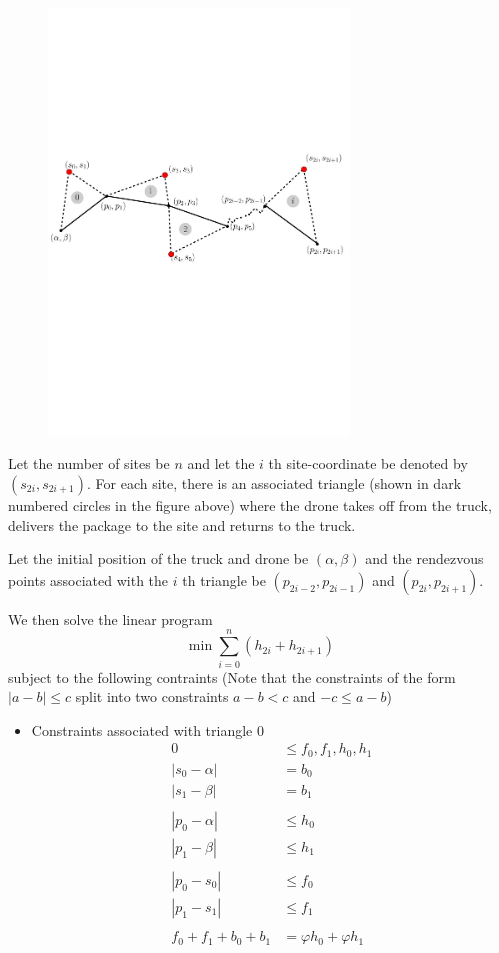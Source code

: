 \documentclass[conference]{IEEEtran}
\begin{document}
{\begin{figure}[h!]
\centering
\includegraphics[width=8cm]{img/lpdescr.pdf}
\end{figure}

Let the number of sites be \(n\) and let the \(i\) th site-coordinate be denoted by \((s_{2i}, s_{2i+1})\).
For each site, there is an associated triangle (shown in dark numbered circles in the figure above) where
the drone takes off from the truck, delivers the package to the site and returns to the truck. 

Let the initial position of the truck and drone be \((\alpha, \beta)\) and the rendezvous
points associated with the \(i\) th triangle be \((p_{2i-2}, p_{2i-1})\) and \((p_{2i}, p_{2i+1})\). 

We then solve the linear program $$\displaystyle \min \sum_{i=0}^{n} (h_{2i}+h_{2i+1})$$ subject to the following contraints
(Note that the constraints of the form $|a-b| \leq c$ split into two constraints $a-b < c$ and $-c \leq a-b$)


\begin{itemize}
\item Constraints associated with triangle \(0\) 
     \begin{align*}
0              &\leq f_{0}, f_{1}, h_{0}, h_{1} \\
| s_0-\alpha | &= b_0 \\ 
| s_1-\beta  | &= b_1 \\ 
\\
| p_0 - \alpha | &\leq h_0 \\
| p_1 - \beta  | &\leq h_1 \\
\\
| p_0 - s_0 | &\leq f_0 \\ 
| p_1 - s_1 | &\leq f_1 \\
\\
f_0 + f_1 + b_0 + b_1 &= \varphi h_0 + \varphi h_1
\end{align*}


\end{itemize}}
\end{document}
